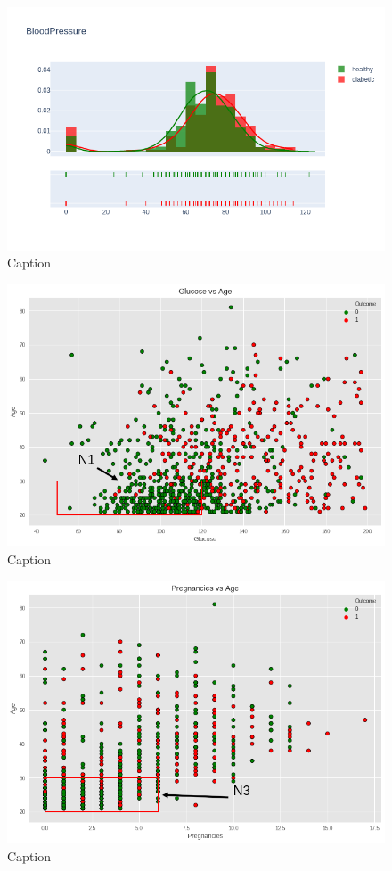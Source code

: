 \documentclass[12pt]{article}
\begin{document}
\begin{figure}[ht]
\centering
\includegraphics[width=1\textwidth]{9.png}
\caption{\label{fig:17} Caption}
\end{figure}

\begin{figure}[ht]
\centering
\includegraphics[width=1\textwidth]{download(1).png}
\caption{\label{fig:18} Caption}
\end{figure}

\begin{figure}[ht]
\centering
\includegraphics[width=1\textwidth]{download(2).png}
\caption{\label{fig:19} Caption}
\end{figure}
\end{document}
